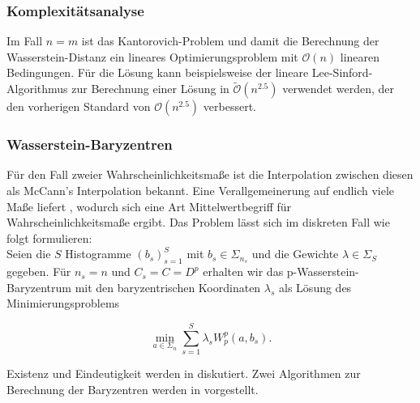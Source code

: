 \documentclass[twoside, 12pt,a4paper]{book}
\numberwithin{equation}{section}
\begin{document}
	
	\subsubsection{Komplexitätsanalyse}
	Im Fall $n=m$ ist das Kantorovich-Problem und damit die Berechnung der Wasserstein-Distanz ein lineares Optimierungsproblem mit $\mathcal{O}(n)$ linearen Bedingungen. Für die Lösung kann beispielsweise der lineare Lee-Sinford-Algorithmus zur Berechnung einer Lösung in $\tilde{\mathcal{O}}(n^{2.5})$ \cite{lee2014path} verwendet werden, der den vorherigen Standard von $\mathcal{O}(n^{2.5})$ \cite{renegar1988polynomial} verbessert.
	\subsubsection{Wasserstein-Baryzentren}
	Für den Fall zweier Wahrscheinlichkeitsmaße ist die Interpolation zwischen diesen als McCann's Interpolation  \cite{mccann} bekannt. Eine Verallgemeinerung auf endlich viele Maße liefert \cite{bary_wasserstein_space}, wodurch sich eine Art Mittelwertbegriff für Wahrscheinlichkeitsmaße ergibt. Das Problem lässt sich im diskreten Fall wie folgt formulieren:\\
	
	
	\noindent Seien die $S$ Histogramme $(b_s)_{s=1}^S$ mit $b_s \in \Sigma_{n_s}$ und die Gewichte $\lambda \in \Sigma_S$ gegeben. Für $n_s=n$ und $C_s=C=D^p$ erhalten wir das p-Wasserstein-Baryzentrum mit den baryzentrischen Koordinaten $\lambda_s$ als Lösung des Minimierungsproblems
	
	\begin{equation}
	\min_{a \in \Sigma_n}{\sum_{s=1}^S \lambda_s{W_p^p(a,b_s)}}.
	\end{equation}
	
	\noindent Existenz und Eindeutigkeit werden in \cite{bary_wasserstein_space} diskutiert.
	Zwei Algorithmen zur Berechnung der Baryzentren werden in \cite{carlier2015numerical} vorgestellt.
	

	
\end{document}

